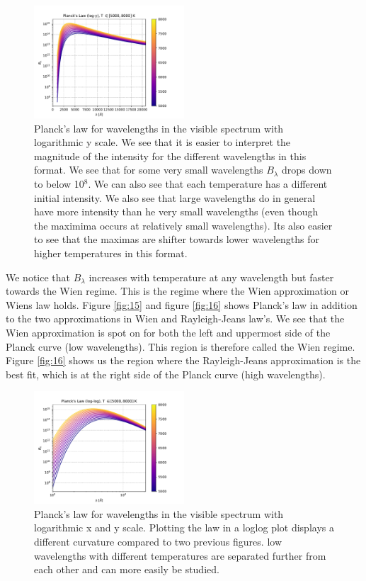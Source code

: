 \documentclass[a4paper,11.5pt,]{article}
\begin{document}
\begin{multicols}{2}
\begin{figure}[H]
	\centering
	\includegraphics[width=0.5\textwidth]{SSA/figures/plancklog.pdf}
	\caption{Planck's law for wavelengths in the visible spectrum with logarithmic y scale. We see that it is easier to interpret the magnitude of the intensity for the different wavelengths in this format. We see that for some very small wavelengths $B_\lambda$ drops down to below 10$^8$. We can also see that each temperature has a different initial intensity. We also see that large wavelengths do in general have more intensity than he very small wavelengths (even though the maximima occurs at relatively small wavelengths). Its also easier to see that the maximas are shifter towards lower wavelengths for higher temperatures in this format.}
	\label{fig:13}
\end{figure}

We notice that $B_\lambda$ increases with temperature at any wavelength but faster towards the Wien regime. This is the regime where the Wien approximation or Wiens law holds. Figure \ref{fig:15} and figure \ref{fig:16} shows Planck's law in addition to the two approximations in Wien and Rayleigh-Jeans law's. We see that the Wien approximation is spot on for both the left and uppermost side of the Planck curve (low wavelengths). This region is therefore called the Wien regime. Figure \ref{fig:16} shows us the region where the Rayleigh-Jeans approximation is the best fit, which is at the right side of the Planck curve (high wavelengths). 



\begin{figure}[H]
	\centering
	\includegraphics[width=0.5\textwidth]{SSA/figures/planckloglog.pdf}
	\caption{Planck's law for wavelengths in the visible spectrum with logarithmic x and y scale. Plotting the law in a loglog plot displays a different curvature compared to two previous figures. low wavelengths with different temperatures are separated further from each other and can more easily be studied.}
	\label{fig:14}
\end{figure}
 

\end{multicols}
\end{document}
